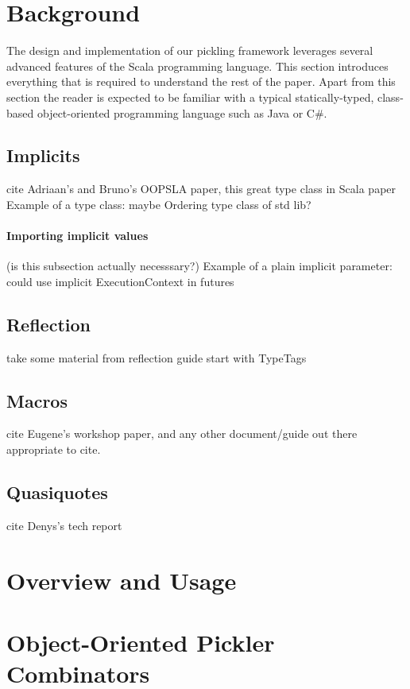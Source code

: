 \documentclass[preprint,10pt]{sigplanconf}
\begin{document}
\section{Background}

The design and implementation of our pickling framework leverages
several advanced features of the Scala programming language. This
section introduces everything that is required to understand the rest
of the paper. Apart from this section the reader is expected to be
familiar with a typical statically-typed, class-based object-oriented
programming language such as Java or C\#.

\subsection{Implicits}
cite Adriaan's and Bruno's OOPSLA paper, this great type class in Scala paper
Example of a type class: maybe Ordering type class of std lib?

\paragraph{Importing implicit values}
(is this subsection actually necesssary?)
Example of a plain implicit parameter: could use implicit ExecutionContext in futures

\subsection{Reflection}
take some material from reflection guide
start with TypeTags

\subsection{Macros}
cite Eugene's workshop paper, and any other document/guide out there appropriate to cite.

\subsection{Quasiquotes}
cite Denys's tech report


\section{Overview and Usage}
\label{sec:overview}

\section{Object-Oriented Pickler Combinators}
\end{document}
